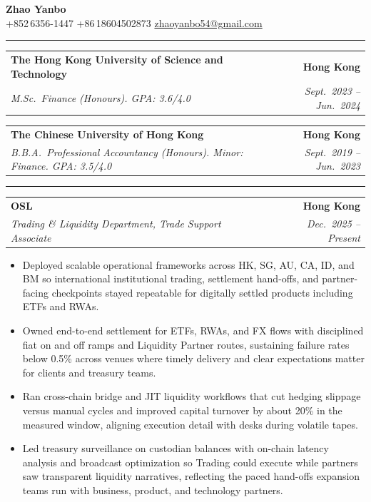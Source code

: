 \documentclass[9pt,a4paper]{extarticle}
\makeatletter
\newcommand{\ressection}[1]{%
  \vspace{0.8em}%
  \noindent{\large\scshape\bfseries #1}\par\nobreak
  \vspace{-\parskip}%
  \vspace{-\parskip}%
  \vspace{-\parskip}%
  \vspace{-\parskip}%
  \noindent\rule{\linewidth}{0.1pt}\par\nobreak
  \vspace{-\parskip}%
}
\newcommand{\resumeSubheading}[4]{%
  \vspace{0.6em}%
  \begin{tabular*}{\textwidth}{l@{\extracolsep{\fill}}r}
    \textbf{#1} & \textbf{#2} \\
    \textit{\small #3} & \textit{\small #4} \\
  \end{tabular*}\vspace{0.32em}}
\makeatother
\begin{document}
\begin{center}
  {\LARGE\bfseries Zhao Yanbo}\\[0.35em]
  \small
  +852\,6356-1447 \;\textbar\;
  +86\,18604502873 \;\textbar\;
  \href{mailto:zhaoyanbo54@gmail.com}{zhaoyanbo54@gmail.com}
\end{center}
\vspace{-0.2em}

\ressection{Education}

\resumeSubheading{The Hong Kong University of Science and Technology}{Hong Kong}{M.Sc.\ Finance (Honours). GPA: 3.6/4.0}{Sept.\ 2023 -- Jun.\ 2024}

\resumeSubheading{The Chinese University of Hong Kong}{Hong Kong}{B.B.A.\ Professional Accountancy (Honours). Minor: Finance. GPA: 3.5/4.0}{Sept.\ 2019 -- Jun.\ 2023}

\ressection{Work Experience}

\resumeSubheading{OSL}{Hong Kong}{Trading \& Liquidity Department, Trade Support Associate}{Dec.\ 2025 -- Present}
\begin{itemize}
  \item Deployed scalable operational frameworks across HK, SG, AU, CA, ID, and BM so international institutional trading, settlement hand-offs, and partner-facing checkpoints stayed repeatable for digitally settled products including ETFs and RWAs.
  \item Owned end-to-end settlement for ETFs, RWAs, and FX flows with disciplined fiat on and off ramps and Liquidity Partner routes, sustaining failure rates below 0.5\% across venues where timely delivery and clear expectations matter for clients and treasury teams.
  \item Ran cross-chain bridge and JIT liquidity workflows that cut hedging slippage versus manual cycles and improved capital turnover by about 20\% in the measured window, aligning execution detail with desks during volatile tapes.
  \item Led treasury surveillance on custodian balances with on-chain latency analysis and broadcast optimization so Trading could execute while partners saw transparent liquidity narratives, reflecting the paced hand-offs expansion teams run with business, product, and technology partners.
\end{itemize}
\end{document}
